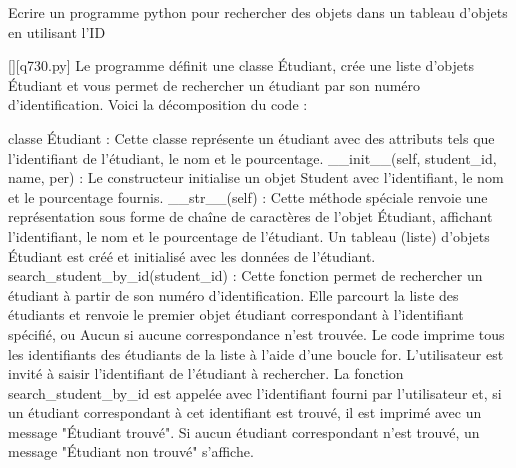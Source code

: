        \question
        Ecrire un programme python pour rechercher des objets dans un tableau d'objets en utilisant l'ID
        \par
        \begin{solution}
            \renewcommand{\nomfichier}{q730.py}
            \pythonfile{\chemincode \nomfichier}[][\nomfichier]
            Le programme définit une classe Étudiant, crée une liste d'objets Étudiant et vous permet de rechercher un étudiant par son numéro d'identification. Voici la décomposition du code :

    classe Étudiant : Cette classe représente un étudiant avec des attributs tels que l'identifiant de l'étudiant, le nom et le pourcentage.
    \_\_init\_\_(self, student\_id, name, per) : Le constructeur initialise un objet Student avec l'identifiant, le nom et le pourcentage fournis.
    \_\_str\_\_(self) : Cette méthode spéciale renvoie une représentation sous forme de chaîne de caractères de l'objet Étudiant, affichant l'identifiant, le nom et le pourcentage de l'étudiant.
    Un tableau (liste) d'objets Étudiant est créé et initialisé avec les données de l'étudiant.
    search\_student\_by\_id(student\_id) : Cette fonction permet de rechercher un étudiant à partir de son numéro d'identification. Elle parcourt la liste des étudiants et renvoie le premier objet étudiant correspondant à l'identifiant spécifié, ou Aucun si aucune correspondance n'est trouvée.
    Le code imprime tous les identifiants des étudiants de la liste à l'aide d'une boucle for.
    L'utilisateur est invité à saisir l'identifiant de l'étudiant à rechercher.
    La fonction search\_student\_by\_id est appelée avec l'identifiant fourni par l'utilisateur et, si un étudiant correspondant à cet identifiant est trouvé, il est imprimé avec un message "Étudiant trouvé". Si aucun étudiant correspondant n'est trouvé, un message "Étudiant non trouvé" s'affiche.
        \end{solution}
        

